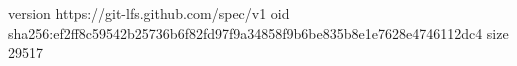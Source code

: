 version https://git-lfs.github.com/spec/v1
oid sha256:ef2ff8c59542b25736b6f82fd97f9a34858f9b6be835b8e1e7628e4746112dc4
size 29517

